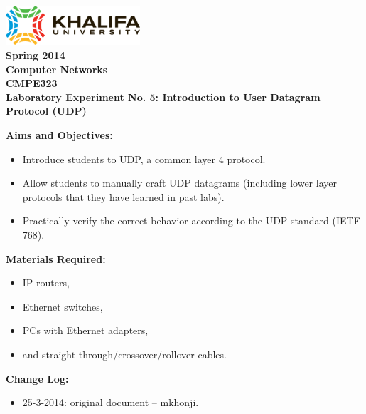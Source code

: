 \documentclass[pdftex,12pt,a4paper]{article}
\begin{document}
    \begin{titlepage}
        \begin{center}
            \includegraphics[width=5cm]{figures/kulogo}\\[1cm]
            {\Large \bfseries
                Spring 2014\\
                Computer Networks\\
                CMPE323\\[1cm]
            }
            {\large \bfseries
                \noindent Laboratory Experiment No. 5: Introduction to User
                Datagram Protocol (UDP)\\[1cm]
            }
        \end{center}

        \noindent \textbf{Aims and Objectives:}
            \begin{itemize}[leftmargin=4cm]
                \item Introduce students to UDP, a common layer 4 protocol.
                \item Allow students to manually craft UDP datagrams (including
                    lower layer protocols that they have learned in past labs).
                \item Practically verify the correct behavior according to the
                    UDP standard (IETF 768).
            \end{itemize}
            \vspace{0.5cm}

        \noindent \textbf{Materials Required:}
            \begin{itemize}[leftmargin=4cm]
                \item IP routers,
                \item Ethernet switches,
                \item PCs with Ethernet adapters,
                \item and straight-through/crossover/rollover cables.
            \end{itemize}
            \vspace{0.5cm}

        \noindent \textbf{Change Log:}
            \begin{itemize}[leftmargin=4cm]
                \item 25-3-2014: original document -- mkhonji.
            \end{itemize}
    \end{titlepage}
    \newpage
\end{document}
